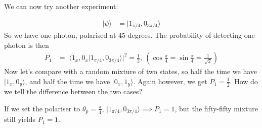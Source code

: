 \documentclass[a4paper, 11pt, normalem]{report}
\begin{document}
We can now try another experiment:
\begin{figure}[H]
    \centering
    \vspace{-30pt}
\end{figure}
\begin{align}
    |\psi\rangle &= |1_{\pi/4},0_{3\pi/4}\rangle
\end{align}
So we have one photon, polarised at 45 degrees. 
The probability of detecting one photon is then
\begin{align}
    P_1 &= |\langle1_x,0_x|1_{\pi/4},0_{3\pi/4}\rangle|^2 = \frac12,~ (\cos\frac{\pi}{4} = \sin\frac{\pi}{4} = \frac{1}{\sqrt{2}})
\end{align}
Now let's compare with a random mixture of two states, so half the time we have $|1_x,0_y\rangle$, and half the time we have $|0_x,1_y\rangle$.
Again however, we get $P_1=\frac12$. 
How do we tell the difference between the two cases?

If we set the polariser to $\theta_p = \frac{\pi}{4}$, $|1_{\pi/4},0_{3\pi/4}\rangle \implies P_1 = 1$, but the fifty-fifty mixture still yields $P_1=1$.
\end{document}
